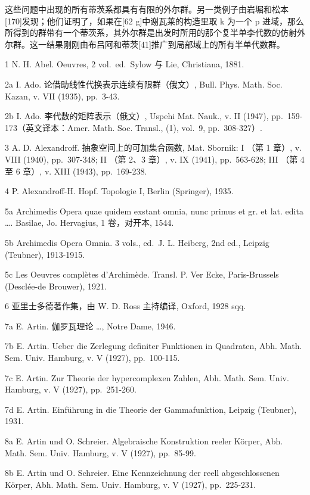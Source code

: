 这些问题中出现的所有蒂茨系都具有有限的外尔群。另一类例子由岩堀和松本{[}170{]}发现；他们证明了，如果在{[}62 g{]}中谢瓦莱的构造里取 k 为一个 p 进域，那么所得到的群带有一个蒂茨系，其外尔群是出发时所用的那个复半单李代数的仿射外尔群。这一结果刚刚由布吕阿和蒂茨{[}41{]}推广到局部域上的所有半单代数群。


1 N. H. Abel. Oeuvres, 2 vol.~ed.~Sylow 与 Lie, Christiana, 1881.

2a I. Ado. 论借助线性代换表示连续有限群（俄文）, Bull. Phys. Math. Soc. Kazan, v. VII (1935), pp.~3-43.

2b I. Ado. 李代数的矩阵表示（俄文）, Uspehi Mat. Nauk., v. II (1947), pp.~159-173（英文译本：Amer. Math. Soc. Transl., (1), vol.~9, pp.~308-327）.

3 A. D. Alexandroff. 抽象空间上的可加集合函数, Mat. Sbornik: I （第 1 章）, v. VIII (1940), pp.~307-348; II （第 2、3 章）, v. IX (1941), pp.~563-628; III （第 4 至 6 章）, v. XIII (1943), pp.~169-238.

4 P. Alexandroff-H. Hopf. Topologie I, Berlin (Springer), 1935.

5a Archimedis Opera quae quidem exstant omnia, nunc primus et gr. et lat. edita \ldots. Basilae, Jo. Hervagius, 1 卷，对开本, 1544.

5b Archimedis Opera Omnia. 3 vols., ed.~J. L. Heiberg, 2nd ed., Leipzig (Teubner), 1913-1915.

5c Les Oeuvres complètes d'Archimède. Transl. P. Ver Ecke, Paris-Brussels (Desclée-de Brouwer), 1921.

6 亚里士多德著作集，由 W. D. Ross 主持编译, Oxford, 1928 sqq.

7a E. Artin. 伽罗瓦理论 \ldots, Notre Dame, 1946.

7b E. Artin. Ueber die Zerlegung definiter Funktionen in Quadraten, Abh. Math. Sem. Univ. Hamburg, v. V (1927), pp.~100-115.

7c E. Artin. Zur Theorie der hypercomplexen Zahlen, Abh. Math. Sem. Univ. Hamburg, v. V (1927), pp.~251-260.

7d E. Artin. Einführung in die Theorie der Gammafunktion, Leipzig (Teubner), 1931.

8a E. Artin und O. Schreier. Algebraische Konstruktion reeler Körper, Abh. Math. Sem. Univ. Hamburg, v. V (1927), pp.~85-99.

8b E. Artin und O. Schreier. Eine Kennzeichnung der reell abgeschlossenen Körper, Abh. Math. Sem. Univ. Hamburg, v. V (1927), pp.~225-231.

